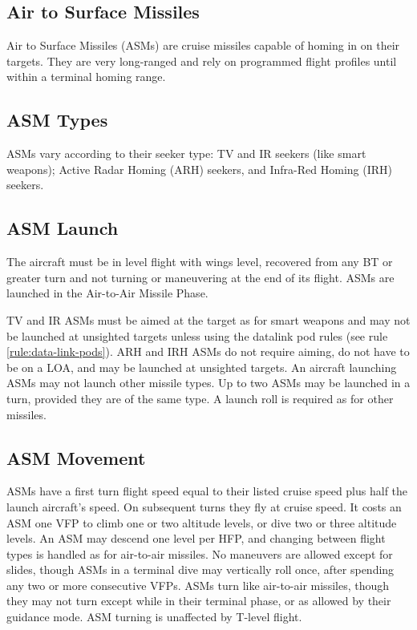 \begin{advancedrules}


    \section{Air to Surface Missiles}

    Air to Surface Missiles (ASMs) are cruise missiles capable of homing in on their targets.  They are very long-ranged and rely on programmed flight profiles until within a terminal homing range.

    \subsection{ASM Types} ASMs vary according to their seeker type: TV and IR seekers (like smart weapons); Active Radar Homing (ARH) seekers, and Infra-Red Homing (IRH) seekers.

    \subsection{ASM Launch} The aircraft must be in level flight with wings level, recovered from any BT or greater turn and not turning or maneuvering at the end of its flight.  ASMs are launched in the Air-to-Air Missile Phase.

    TV and IR ASMs must be aimed at the target as for smart weapons and may not be launched at unsighted targets unless using the datalink pod rules (see rule \ref{rule:data-link-pods}).  ARH and IRH ASMs do not require aiming, do not have to be on a LOA, and may be launched at unsighted targets.  An aircraft launching ASMs may not launch other missile types.  Up to two ASMs may be launched in a turn, provided they are of the same type.  A launch roll is required as for other missiles.

    \subsection{ASM Movement} ASMs have a first turn flight speed equal to their listed cruise speed plus half the launch aircraft's speed.  On subsequent turns they fly at cruise speed.  It costs an ASM one VFP to climb one or two altitude levels, or dive two or three altitude levels.   An ASM may descend one level per HFP, and changing between flight types is handled as for air-to-air missiles.  No maneuvers are allowed except for slides, though ASMs in a terminal dive may vertically roll once, after spending any two or more consecutive VFPs.  ASMs turn like air-to-air missiles, though they may not turn except while in their terminal phase, or as allowed by their guidance mode.  ASM turning is unaffected by T-level flight.


\end{advancedrules}
